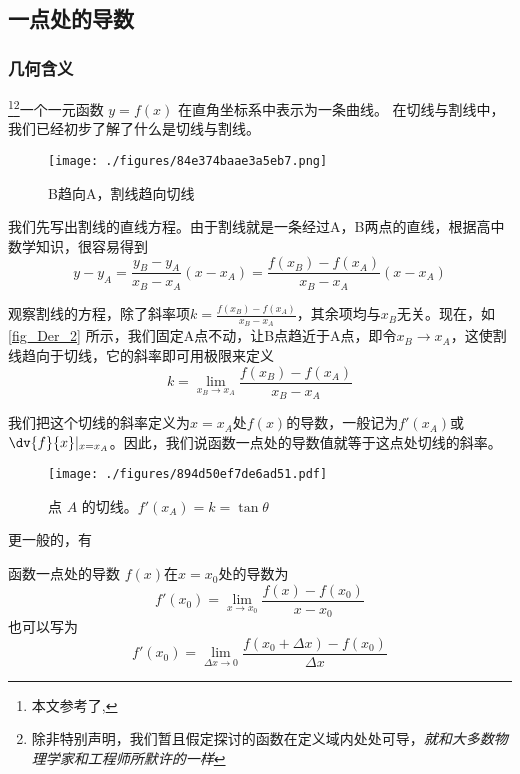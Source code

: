 

\subsection{一点处的导数}
\subsubsection{几何含义}
\footnote{本文参考了\cite{同济高},\cite{Thomas}}\footnote{除非特别声明，我们暂且假定探讨的函数在定义域内处处可导，\textsl{就和大多数物理学家和工程师所默许的一样}}一个一元函数 $y = f(x)$ 在直角坐标系中表示为一条曲线。 在切线与割线中，我们已经初步了解了什么是切线与割线。

\begin{figure}[ht]
\centering
\texttt{[image: ./figures/84e374baae3a5eb7.png]}
\caption{B趋向A，割线趋向切线} \label{fig_Der_2}
\end{figure}

我们先写出割线的直线方程。由于割线就是一条经过A，B两点的直线，根据高中数学知识，很容易得到
\begin{equation}
y-y_A=\frac{y_B-y_A}{x_B-x_A}(x-x_A)=\frac{f(x_B)-f(x_A)}{x_B-x_A}(x-x_A)
\end{equation}

观察割线的方程，除了斜率项$k=\frac{f(x_B)-f(x_A)}{x_B-x_A}$，其余项均与$x_B$无关。现在，如\autoref{fig_Der_2} 所示，我们固定A点不动，让B点趋近于A点，即令$x_B\rightarrow x_A$，这使割线趋向于切线，它的斜率即可用极限来定义
\begin{equation}
k=\lim_{x_B\to x_A}\frac{f(x_B)-f(x_A)}{x_B-x_A}
\end{equation}

我们把这个切线的斜率定义为$x=x_A$处$f(x)$的导数，一般记为$f'(x_A)$或$\dv{f}{x}|_{x=x_A}$。因此，我们说函数一点处的导数值就等于这点处切线的斜率。

\begin{figure}[ht]
\centering
\texttt{[image: ./figures/894d50ef7de6ad51.pdf]}
\caption{点 $A$ 的切线。$f'(x_A)=k=\tan \theta$} \label{fig_Der_20}
\end{figure}

更一般的，有
\begin{definition}{函数一点处的导数}
$f(x)$在$x=x_0$处的导数为
\begin{equation}
f'(x_0)=\lim_{x\to x_0}\frac{f(x)-f(x_0)}{x-x_0}
\end{equation}
也可以写为
\begin{equation}\label{eq_Der_2}
f'(x_0)=\lim_{\Delta x \to 0}\frac{f(x_0+\Delta x)-f(x_0)}{\Delta x}
\end{equation}
\end{definition}

